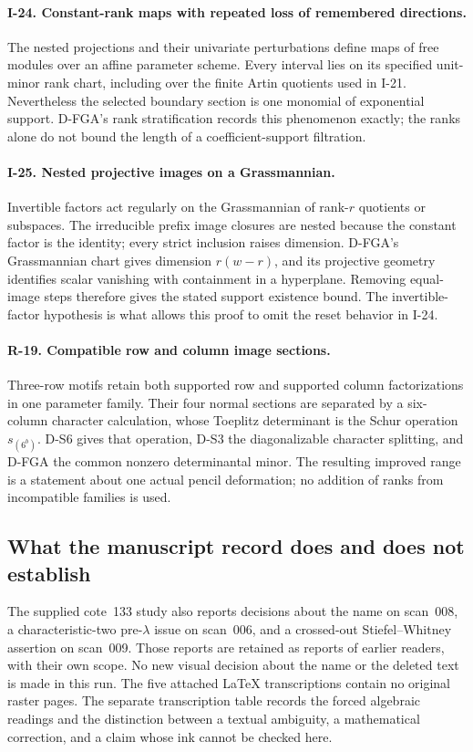 \documentclass[11pt,a4paper]{article}
\theoremstyle{definition}\newtheorem{definition}{Definition}
\begin{document}
\paragraph{I-24. Constant-rank maps with repeated loss of remembered directions.}
The nested projections and their univariate perturbations define maps of free modules over an affine parameter scheme. Every interval lies on its specified unit-minor rank chart, including over the finite Artin quotients used in I-21. Nevertheless the selected boundary section is one monomial of exponential support. D-FGA's rank stratification records this phenomenon exactly; the ranks alone do not bound the length of a coefficient-support filtration.

\paragraph{I-25. Nested projective images on a Grassmannian.}
Invertible factors act regularly on the Grassmannian of rank-$r$ quotients or subspaces. The irreducible prefix image closures are nested because the constant factor is the identity; every strict inclusion raises dimension. D-FGA's Grassmannian chart gives dimension $r(w-r)$, and its projective geometry identifies scalar vanishing with containment in a hyperplane. Removing equal-image steps therefore gives the stated support existence bound. The invertible-factor hypothesis is what allows this proof to omit the reset behavior in I-24.

\paragraph{R-19. Compatible row and column image sections.}
Three-row motifs retain both supported row and supported column factorizations in one parameter family. Their four normal sections are separated by a six-column character calculation, whose Toeplitz determinant is the Schur operation $s_{(6^b)}$. D-S6 gives that operation, D-S3 the diagonalizable character splitting, and D-FGA the common nonzero determinantal minor. The resulting improved range is a statement about one actual pencil deformation; no addition of ranks from incompatible families is used.

\subsection{What the manuscript record does and does not establish}
The supplied cote~133 study also reports decisions about the name on scan~008, a characteristic-two pre-$\lambda$ issue on scan~006, and a crossed-out Stiefel--Whitney assertion on scan~009. Those reports are retained as reports of earlier readers, with their own scope. No new visual decision about the name or the deleted text is made in this run. The five attached LaTeX transcriptions contain no original raster pages. The separate transcription table records the forced algebraic readings and the distinction between a textual ambiguity, a mathematical correction, and a claim whose ink cannot be checked here.
\end{document}
